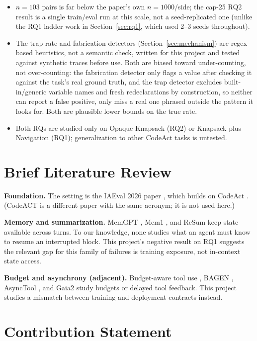 \documentclass[11pt,a4paper]{article}
\begin{document}
\begin{itemize}
\item $n=103$ pairs is far below the paper's own $n=1000$/side; the cap-25 RQ2 result is a single
  train/eval run at this scale, not a seed-replicated one (unlike the RQ1 ladder work in Section~\ref{sec:rq1},
  which used 2--3 seeds throughout).
\item The trap-rate and fabrication detectors (Section~\ref{sec:mechanism}) are regex-based
  heuristics, not a semantic check, written for this project and tested against synthetic traces
  before use. Both are biased toward under-counting, not over-counting: the fabrication detector
  only flags a value after checking it against the task's real ground truth, and the trap
  detector excludes built-in/generic variable names and fresh redeclarations by construction, so
  neither can report a false positive, only miss a real one phrased outside the pattern it looks
  for. Both are plausible lower bounds on the true rate.
\item Both RQs are studied only on Opaque Knapsack (RQ2) or Knapsack plus Navigation (RQ1); generalization to other CodeAct tasks is untested.
\end{itemize}

\section{Brief Literature Review}
\label{sec:litreview}

\textbf{Foundation.} The setting is the IAEval 2026 paper \cite{paper}, which builds on CodeAct
\cite{codeact}. (CodeACT \cite{codeact2} is a different paper with the same acronym; it is not
used here.)

\textbf{Memory and summarization.} MemGPT \cite{memgpt}, Mem1 \cite{mem1}, and ReSum
\cite{resum} keep state available across turns. To our knowledge, none studies what an agent
must know to resume an interrupted block. This project's negative result on RQ1 suggests the
relevant gap for this family of failures is training exposure, not in-context state access.

\textbf{Budget and asynchrony (adjacent).} Budget-aware tool use \cite{budget}, BAGEN
\cite{bagen}, AsyncTool \cite{asynctool}, and Gaia2 \cite{gaia2} study budgets or delayed tool
feedback. This project studies a mismatch between training and deployment contracts instead.

\section{Contribution Statement}
\label{sec:contribution}
\end{document}
